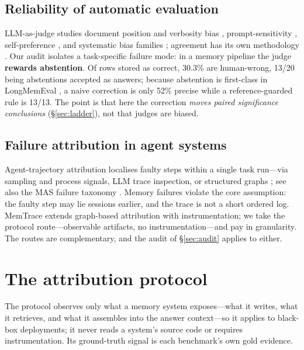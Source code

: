\documentclass[11pt]{article}
\begin{document}
\subsection{Reliability of automatic evaluation}

LLM-as-judge studies document position and verbosity bias
\citep{zheng2023judging,wang2024notfairevaluators}, prompt-sensitivity
\citep{liu2023geval}, self-preference \citep{panickssery2024selfpreference},
and systematic bias families
\citep{ye2025justice,chen2024humansjudge,shi2025judgingjudges}; agreement has
its own methodology \citep{artstein2008kappa}. Our audit isolates a
task-specific failure mode: in a memory pipeline the judge \textbf{rewards
abstention}. Of rows stored as correct, 30.3\% are human-wrong, 13/20 being
abstentions accepted as answers; because abstention is first-class in
LongMemEval \citep{wu2025longmemeval}, a naive correction is only 52\%
precise while a reference-guarded rule is 13/13. The point is that here the
correction \emph{moves paired significance conclusions} (\S\ref{sec:ladder}),
not that judges are biased.

\subsection{Failure attribution in agent systems}

Agent-trajectory attribution localises faulty steps within a single task
run---via sampling and process signals, LLM trace inspection, or structured
graphs \citep{zhang2025whoandwhen,agentracer2025,bonagiri2026causalflow}; see
also the MAS failure taxonomy \citep{cemri2025whymasfail}. Memory failures
violate the core assumption: the faulty step may lie sessions earlier, and
the trace is not a short ordered log. MemTrace extends graph-based
attribution with instrumentation; we take the protocol route---observable
artifacts, no instrumentation---and pay in granularity. The routes are
complementary, and the audit of \S\ref{sec:audit} applies to either.

\section{The attribution protocol}
\label{sec:protocol}

The protocol observes only what a memory system exposes---what it writes, what
it retrieves, and what it assembles into the answer context---so it applies to
black-box deployments; it never reads a system's source code or requires
instrumentation. Its ground-truth signal is each benchmark's own gold evidence.
\end{document}
